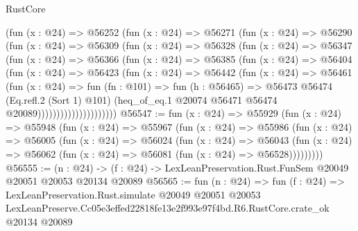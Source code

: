 \begin{lexlean}{RustCore}
\begin{coremodule}
                  (fun (x : @24) =>
                  @56252
                    (fun (x : @24) =>
                    @56271
                      (fun (x : @24) =>
                      @56290
                        (fun (x : @24) =>
                        @56309
                          (fun (x : @24) =>
                          @56328
                            (fun (x : @24) =>
                            @56347
                              (fun (x : @24) =>
                              @56366
                                (fun (x : @24) =>
                                @56385
                                  (fun (x : @24) =>
                                  @56404
                                    (fun (x : @24) =>
                                    @56423
                                      (fun (x : @24) =>
                                      @56442
                                        (fun (x : @24) =>
                                        @56461
                                          (fun (x : @24) =>
                                          fun (fn : @101) =>
                                          fun (h : @56465) =>
                                          @56473
                                            @56474
                                            (Eq.refl.{2} (Sort 1) @101)
                                            (heq_of_eq.{1}
                                              @20074
                                              @56471
                                              @56474
                                              @20089)))))))))))))))))))))
@56547 := fun (x : @24) =>
  @55929
    (fun (x : @24) =>
    @55948
      (fun (x : @24) =>
      @55967
        (fun (x : @24) =>
        @55986
          (fun (x : @24) =>
          @56005
            (fun (x : @24) =>
            @56024
              (fun (x : @24) =>
              @56043
                (fun (x : @24) => @56062 (fun (x : @24) => @56081 (fun (x : @24) => @56528)))))))))
@56555 := (n : @24) ->
  (f : @24) -> LexLeanPreservation.Rust.FunSem @20049 @20051 @20053 @20134 @20089
@56565 := fun (n : @24) =>
  fun (f : @24) =>
  LexLeanPreservation.Rust.simulate
    @20049
    @20051
    @20053
    LexLeanPreserve.Cc05e3effed22818fe13e2f993e97f4bd.R6.RustCore.crate_ok
    @20134
    @20089
\end{coremodule}
\end{lexlean}
